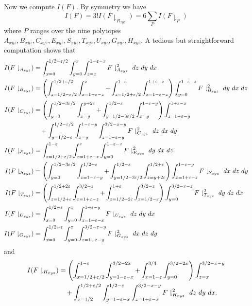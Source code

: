 Now we compute $I(F)$.  By symmetry we have
$$ I(F) = 3! I(F \downharpoonright_{R_{xyz}} ) = 6 \sum_P I( F \downharpoonright_P ) $$
where $P$ ranges over the nine polytopes $A_{xyz}, B_{xyz}, C_{xyz}, E_{xyz}, S_{xyz}, T_{xyz}, U_{xyz}, G_{xyz}, H_{xyz}$.  A tedious but straightforward computation shows that
\begin{align*}
I(F\downharpoonright_{A_{xyz}}) & =\int_{x=0}^{1/2-\eps/2}\int_{y=0}^{x}\int_{z=x}^{1-\eps-x}F\downharpoonright_{A_{xyz}}^2\ dz\ dy\ dx \\
I(F\downharpoonright_{B_{xyz}}) &= \left(\int_{z=1/2-\eps/2}^{1/2+\eps/2}\int_{x=1-\eps-z}^{z} +\int_{z=1/2+\eps/2}^{1-\eps}\int_{x=1-\eps-z}^{1+\eps-z}\right) \int_{y=0}^{1-\eps-z}F\downharpoonright_{B_{xyz}}^2\ dy\ dx\ dz \\
I(F\downharpoonright_{C_{xyz}}) & = \left(\int_{y=0}^{1/2-3\eps/2} \int_{x=y}^{y+2\eps} + \int_{y=1/2-3\eps/2}^{1/2-\eps}\int_{x=y}^{1-\eps-y} \right) \int_{z=1-\eps-y}^{1+\eps-x} \\
&\quad + \int_{y=1/2-\eps}^{1/2-\eps/2}\int_{x=y}^{1-\eps-y}\int_{z=1-\eps-y}^{3/2-x-y} F\downharpoonright_{C_{xyz}}^2\ dz\ dx\ dy \\
I(F\downharpoonright_{E_{xyz}}) & = \int_{z=1/2+\eps/2}^{1-\eps}\int_{x=1+\eps-z}^{z}\int_{y=0}^{1-\eps-z} F\downharpoonright_{E_{xyz}}^2\ dy\ dx\ dz \\
I(F\downharpoonright_{S_{xyz}}) & =  \left(\int_{y=0}^{1/2-3\eps/2}\int_{z=1-\eps-y}^{1/2+\eps} +\int_{y=1/2-3\eps/2}^{1/2-\eps}\int_{z=y+2\eps}^{1/2+\eps} \right)\int_{x=1+\eps-z}^{1-\eps-y} F\downharpoonright_{S_{xyz}}\ dx\ dz\ dy \\
I(F\downharpoonright_{T_{xyz}}) &  = \left(\int_{z=1/2+\eps}^{1/2+2\eps}\int_{x=1+\eps-z}^{3/2-z} + \int_{z=1/2+2\eps}^{1+\eps}\int_{x=1/2-\eps}^{3/2-z}\right)\int_{y=0}^{3/2-x-z} F\downharpoonright_{T_{xyz}}^2\ dy\ dz\ dx \\
I(F\downharpoonright_{U_{xyz}}) & = \int_{x=0}^{1/2-\eps}\int_{y=0}^{x}\int_{z=1+\eps-x}^{1+\eps-y} F\downharpoonright_{U_{xyz}}\ dz\ dy\ dx\\
I(F\downharpoonright_{G_{xyz}}) & = \int_{x=0}^{1/2-\eps}\int_{y=0}^{x}\int_{z=1+\eps-y}^{3/2-x-y} F\downharpoonright_{G_{xyz}}^2\ dx\ dz\ dy
\end{align*}
and
\begin{align*}
I(F\downharpoonright_{H_{xyz}}) & =\left(\int_{x=1/2+\varepsilon/2}^{1-\varepsilon}\int_{y=1-\varepsilon-x}^{3/2-2x} +\int_{x=1-\varepsilon}^{3/4}\int_{y=0}^{3/2-2x} \right) \int_{z=x}^{3/2-x-y}\\
&\quad + \int_{x=1/2}^{1/2+\varepsilon/2}\int_{y=1-\varepsilon-x}^{1/2-\varepsilon}\int_{z=1+\varepsilon-x}^{3/2-x-y} F\downharpoonright_{H_{xyz}}^2\ dz\ dy\ dx.
\end{align*}

